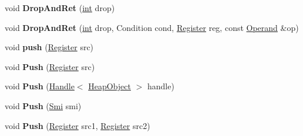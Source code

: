 \begin{DoxyCompactItemize}
\item 
\mbox{\label{classv8_1_1internal_1_1TurboAssembler_abc9eb9fc809f464c9ec874b02142ccc8}} 
void {\bfseries Drop\+And\+Ret} (\mbox{\hyperlink{classint}{int}} drop)
\item 
\mbox{\label{classv8_1_1internal_1_1TurboAssembler_ac05346520d34cffe7e008747c1de8403}} 
void {\bfseries Drop\+And\+Ret} (\mbox{\hyperlink{classint}{int}} drop, Condition cond, \mbox{\hyperlink{classv8_1_1internal_1_1Register}{Register}} reg, const \mbox{\hyperlink{classv8_1_1internal_1_1Operand}{Operand}} \&op)
\item 
\mbox{\label{classv8_1_1internal_1_1TurboAssembler_ad76c4db282f973f837a7960f126cd658}} 
void {\bfseries push} (\mbox{\hyperlink{classv8_1_1internal_1_1Register}{Register}} src)
\item 
\mbox{\label{classv8_1_1internal_1_1TurboAssembler_a55fb0229c0743b3076b5f3c5474e321b}} 
void {\bfseries Push} (\mbox{\hyperlink{classv8_1_1internal_1_1Register}{Register}} src)
\item 
\mbox{\label{classv8_1_1internal_1_1TurboAssembler_a5524deaafc5f8d02a285a17deb639215}} 
void {\bfseries Push} (\mbox{\hyperlink{classv8_1_1internal_1_1Handle}{Handle}}$<$ \mbox{\hyperlink{classv8_1_1internal_1_1HeapObject}{Heap\+Object}} $>$ handle)
\item 
\mbox{\label{classv8_1_1internal_1_1TurboAssembler_aefc3cd9bb0e7e5183140d11765e18493}} 
void {\bfseries Push} (\mbox{\hyperlink{classv8_1_1internal_1_1Smi}{Smi}} smi)
\item 
\mbox{\label{classv8_1_1internal_1_1TurboAssembler_a9ca38752028f01d27d6ee9b35d4ee768}} 
void {\bfseries Push} (\mbox{\hyperlink{classv8_1_1internal_1_1Register}{Register}} src1, \mbox{\hyperlink{classv8_1_1internal_1_1Register}{Register}} src2)
\item 
\mbox{\label{classv8_1_1internal_1_1TurboAssembler_acd39298b3ea988a8fff7fe3fb441ca27}} 

\end{DoxyCompactItemize}
